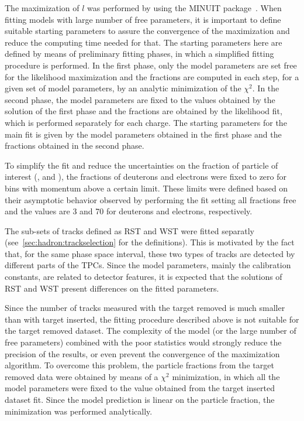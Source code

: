 The maximization of $l$
was performed by using the MINUIT package~\cite{James:1975dr}.
When fitting models with large number of free parameters,
it is important to define suitable starting parameters
to assure the convergence of the maximization and
reduce the computing time needed for that.
The starting parameters here are defined by means of
preliminary fitting phases, in which a simplified fitting
procedure is performed. In the first phase, only the model
parameters are set free for the likelihood maximization
and the fractions are computed in each step,
for a given set of model parameters, by an
analytic minimization of the $\chi^2$.
In the second phase, the model parameters are fixed
to the values obtained by the solution of the first phase
and the fractions are obtained by the likelihood fit,
which is performed separately for each charge.
The starting parameters for the main fit is given by
the model parameters obtained in the first phase and the
fractions obtained in the second phase.

To simplify the fit and reduce the uncertainties on the
fraction of particle of interest (\pions, \kaons and \protons),
the fractions of deuterons and electrons were fixed to zero
for bins with momentum above a certain limit. These limits were
defined based on their asymptotic behavior observed by performing
the fit setting all fractions free and the values are 3 and 70 \GeVc
for deuterons and electrons, respectively. 

The sub-sets of tracks defined as RST and WST were fitted
separatly (see~\cref{sec:hadron:trackselection} for the definitions).
This is motivated by the fact that, for the same phase space
interval, these two types of tracks are detected by
different parts of the TPCs. Since the model parameters,
mainly the calibration constants, are related to
detector features, it is expected that the solutions
of RST and WST present differences on the fitted
parameters.

Since the number of tracks measured with the target removed is much
smaller than with target inserted, the
fitting procedure described above is not suitable for the
target removed dataset. The complexity of the model
(or the large number of free parameters) combined with
the poor statistics would strongly reduce the precision of
the results, or even prevent the convergence of the maximization
algorithm. To overcome this problem, the particle fractions
from the target removed data were obtained by means of
a $\chi^2$ minimization, in which all the model parameters
were fixed to the value obtained from the target inserted
dataset fit. Since the model prediction is linear on
the particle fraction, the minimization was performed
analytically. 

